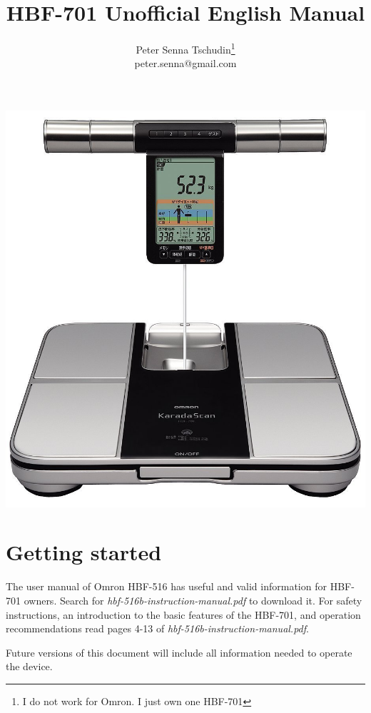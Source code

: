 \documentclass[10pt]{article}
\title{HBF-701 Unofficial English Manual}
\author{Peter Senna Tschudin\footnote{I do not work for Omron. I just own one
HBF-701}\\ {\small peter.senna@gmail.com}}
\begin{document}
\maketitle
\begin{center}
\vspace{15pt}
\includegraphics[width=0.8\linewidth]{images/hbf701.jpg}
\end{center}
\section{Getting started}
\label{sec:starting}
The user manual of Omron HBF-516 has useful and valid information for HBF-701
owners. Search for \textit{hbf-516b-instruction-manual.pdf} to download it. For
safety instructions, an introduction to the basic features of the HBF-701, and
operation recommendations read pages 4-13 of
\textit{hbf-516b-instruction-manual.pdf}.

Future versions of this document will include all information needed to operate
the device.
\end{document}
